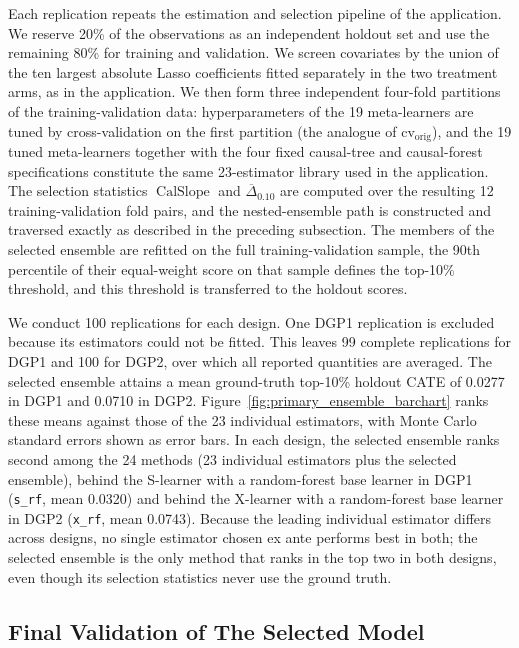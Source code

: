 \documentclass[12pt]{article}
\newcommand{\TargetFrac}{10{\%}\xspace}
\newcommand{\CalSlope}{\ensuremath{\operatorname{CalSlope}}}
\newcommand{\MeanDeltaTopTen}{\ensuremath{\overline{\Delta}_{0.10}}}
\begin{document}
Each replication repeats the estimation and selection pipeline of the application. We reserve 20\% of the observations as an independent holdout set and use the remaining 80\% for training and validation. We screen covariates by the union of the ten largest absolute Lasso coefficients fitted separately in the two treatment arms, as in the application. We then form three independent four-fold partitions of the training-validation data: hyperparameters of the 19 meta-learners are tuned by cross-validation on the first partition (the analogue of $\text{cv}_\text{orig}$), and the 19 tuned meta-learners together with the four fixed causal-tree and causal-forest specifications constitute the same 23-estimator library used in the application. The selection statistics $\CalSlope$ and $\MeanDeltaTopTen$ are computed over the resulting 12 training-validation fold pairs, and the nested-ensemble path is constructed and traversed exactly as described in the preceding subsection. The members of the selected ensemble are refitted on the full training-validation sample, the 90th percentile of their equal-weight score on that sample defines the top-\TargetFrac threshold, and this threshold is transferred to the holdout scores.

We conduct 100 replications for each design. One DGP1 replication is excluded because its estimators could not be fitted. This leaves 99 complete replications for DGP1 and 100 for DGP2, over which all reported quantities are averaged. The selected ensemble attains a mean ground-truth top-\TargetFrac holdout CATE of 0.0277 in DGP1 and 0.0710 in DGP2. Figure~\ref{fig:primary_ensemble_barchart} ranks these means against those of the 23 individual estimators, with Monte Carlo standard errors shown as error bars. In each design, the selected ensemble ranks second among the 24 methods (23 individual estimators plus the selected ensemble), behind the S-learner with a random-forest base learner in DGP1 (\texttt{s\_rf}, mean 0.0320) and behind the X-learner with a random-forest base learner in DGP2 (\texttt{x\_rf}, mean 0.0743). Because the leading individual estimator differs across designs, no single estimator chosen ex ante performs best in both; the selected ensemble is the only method that ranks in the top two in both designs, even though its selection statistics never use the ground truth.



\subsection{Final Validation of The Selected Model}
\label{sec:final_validation}
\end{document}
